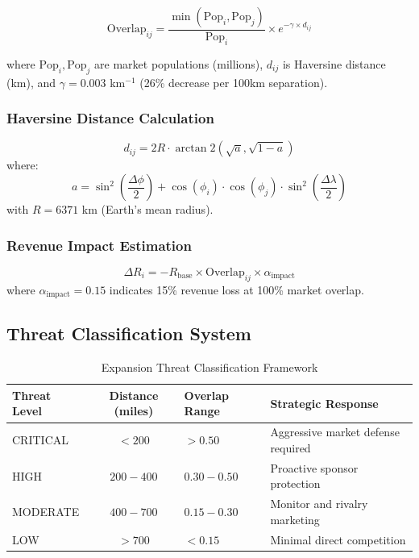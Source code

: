 \documentclass{mcmthesis}
\begin{document}
\begin{equation}
\text{Overlap}_{ij} = \frac{\min(\text{Pop}_i, \text{Pop}_j)}{\text{Pop}_i} \times e^{-\gamma \times d_{ij}}
\end{equation}

where $\text{Pop}_i, \text{Pop}_j$ are market populations (millions), $d_{ij}$ is Haversine distance (km), and $\gamma = 0.003$ km$^{-1}$ (26\% decrease per 100km separation).

\subsubsection{Haversine Distance Calculation}

\begin{equation}
d_{ij} = 2R \cdot \arctan2\left(\sqrt{a}, \sqrt{1-a}\right)
\end{equation}
where:
\begin{equation}
a = \sin^2\left(\frac{\Delta\phi}{2}\right) + \cos(\phi_i) \cdot \cos(\phi_j) \cdot \sin^2\left(\frac{\Delta\lambda}{2}\right)
\end{equation}
with $R = 6371$ km (Earth's mean radius).

\subsubsection{Revenue Impact Estimation}

\begin{equation}
\Delta R_i = -R_{\text{base}} \times \text{Overlap}_{ij} \times \alpha_{\text{impact}}
\end{equation}
where $\alpha_{\text{impact}} = 0.15$ indicates 15\% revenue loss at 100\% market overlap.

\subsection{Threat Classification System}

\begin{table}[H]
\centering
\caption{Expansion Threat Classification Framework}
\begin{tabular}{lcll}
\toprule
\textbf{Threat Level} & \textbf{Distance (miles)} & \textbf{Overlap Range} & \textbf{Strategic Response} \\
\midrule
CRITICAL & $< 200$ & $> 0.50$ & Aggressive market defense required \\
HIGH & $200-400$ & $0.30-0.50$ & Proactive sponsor protection \\
MODERATE & $400-700$ & $0.15-0.30$ & Monitor and rivalry marketing \\
LOW & $> 700$ & $< 0.15$ & Minimal direct competition \\
\bottomrule
\end{tabular}
\end{table}
\end{document}
